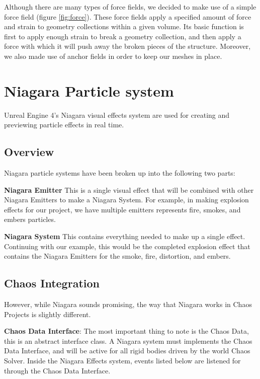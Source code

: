 \documentclass[sigconf]{acmart}
\begin{document}
Although there are many types of force fields, we decided to make use of a simple force field (figure \ref{fig:force}). These force fields apply a specified amount of force and strain to geometry collections within a given volume. Its basic function is first to apply enough strain to break a geometry collection, and then apply a force with which it will push away the broken pieces of the structure. Moreover, we also made use of anchor fields in order to keep our meshes in place.

\section{Niagara Particle system}

Unreal Engine 4's Niagara visual effects system are used for creating and previewing particle effects in real time. 

\subsection{Overview}

Niagara particle systems have been broken up into the following two parts:

\textbf{Niagara Emitter} This is a single visual effect that will be combined with other Niagara Emitters to make a Niagara System. For example, in making explosion effects for our project, we have multiple emitters represents fire, smokes, and embers particles. 

\textbf{Niagara System} This contains everything needed to make up a single effect. Continuing with our example, this would be the completed explosion effect that contains the Niagara Emitters for the smoke, fire, distortion, and embers. 

\subsection{Chaos Integration}

However, while Niagara sounds promising, the way that Niagara works in Chaos Projects is slightly different. 

\textbf{Chaos Data Interface}: The most important thing to note is the Chaos Data, this is an abstract interface class. A Niagara system must implements the Chaos Data Interface, and will be active for all rigid bodies driven by the world Chaos Solver. Inside the Niagara Effects system, events listed below are listened for through the Chaos Data Interface. 
\end{document}
